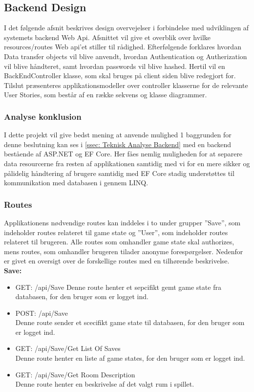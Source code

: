 \subsection{Backend Design}
\label{ssec: Backend Design}

I det følgende afsnit beskrives design overvejelser i forbindelse med udviklingen af systemets backend Web Api. Afsnittet vil give et overblik over hvilke resources/routes Web api’et stiller til rådighed. Efterfølgende forklares hvordan Data transfer objects vil blive anvendt, hvordan Authentication og Autherization vil blive håndteret, samt hvordan passwords vil blive hashed. Hertil vil en BackEndController klasse, som skal bruges på client siden blive redegjort for. Tilslut præsenteres applikationsmodeller over controller klasserne for de relevante User Stories, som består af en række sekvens og klasse diagrammer.\\

\subsubsection{Analyse konklusion}
I dette projekt vil give bedst mening at anvende mulighed 1 baggrunden for denne beslutning kan ses i \autoref{ssec: Teknisk Analyse Backend} med en backend bestående af ASP.NET og EF Core. Her fåes nemlig muligheden for at separere data resourcerne fra resten af applikationen samtidig med vi for en mere sikker og pålidelig håndtering af brugere samtidig med EF Core stadig understøttes til kommunikation med databasen i gennem LINQ.\\

\subsubsection{Routes}
Applikationens nødvendige routes kan inddeles i to under grupper ”Save”, som indeholder routes relateret til game state og ”User”, som indeholder routes relateret til brugeren. Alle routes som omhandler game state skal authorizes, mens routes, som omhandler brugeren tilader anonyme forespørgelser. Nedenfor er givet en oversigt over de forskellige routes med en tilhørende beskrivelse.\\

\textbf{Save:}\\
\begin{itemize}
\item GET: /api/Save
Denne route henter et sepcifikt gemt game state fra databasen, for den bruger som er logget ind.
\item POST: /api/Save\\
Denne route sender et scecifikt game state til databasen, for den bruger som er logget ind.
\item GET: /api/Save/Get List Of Saves\\
Denne route henter en liste af game states, for den bruger som er logget ind. 
\item GET: /api/Save/Get Room Description\\
Denne route henter en beskrivelse af det valgt rum i spillet.
\end{itemize}


